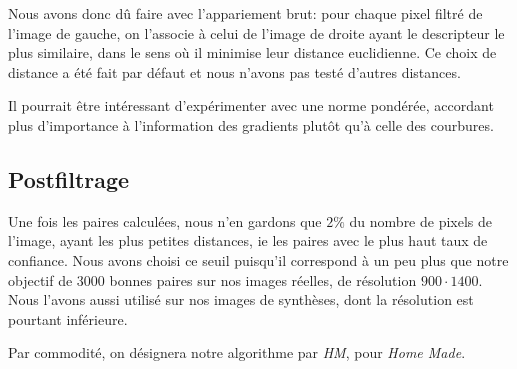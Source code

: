 \documentclass[
	a4paper, %
	10pt, %
	unnumberedsections, %
	twoside, %
]{LTJournalArticle}
\begin{document}
Nous avons donc dû faire avec l'appariement brut: pour chaque pixel filtré de l'image de gauche,
on l'associe à celui de l'image de droite ayant le descripteur le plus similaire,
dans le sens où il minimise leur distance euclidienne.
Ce choix de distance a été fait par défaut et nous n'avons pas testé d'autres distances.

Il pourrait être intéressant d'expérimenter avec une norme pondérée, accordant plus d'importance
à l'information des gradients plutôt qu'à celle des courbures.

\subsection{Postfiltrage}
Une fois les paires calculées, nous n'en gardons que $2 \%$ du nombre de pixels de l'image,
ayant les plus petites distances, ie les paires avec le plus haut taux
de confiance. Nous avons choisi ce seuil puisqu'il correspond à un peu plus que
notre objectif de $3000$ bonnes paires sur nos images réelles, de résolution
$900 \cdot 1400$.
Nous l'avons aussi
utilisé sur nos images de synthèses, dont la résolution est pourtant
inférieure.

Par commodité, on désignera notre algorithme
par \textit{HM}, pour \textit{Home Made}.

\end{document}
